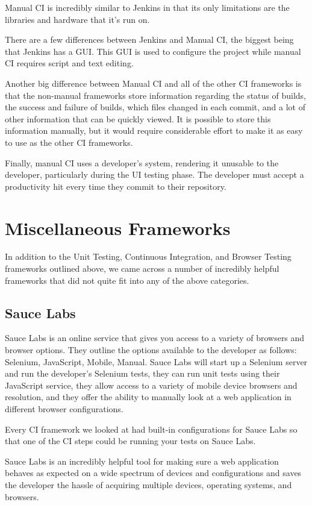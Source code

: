 \documentclass[12pt]{ucthesis}
\begin{document}
Manual CI is incredibly similar to Jenkins in that its only limitations are the libraries and hardware that it's run on.

There are a few differences between Jenkins and Manual CI, the biggest being that Jenkins has a GUI. This GUI is used to configure the project while manual CI requires script and text editing. 

Another big difference between Manual CI and all of the other CI frameworks is that the non-manual frameworks store information regarding the status of builds, the success and failure of builds, which files changed in each commit, and a lot of other information that can be quickly viewed. It is possible to store this information manually, but it would require considerable effort to make it as easy to use as the other CI frameworks.

Finally, manual CI uses a developer's system, rendering it unusable to the developer, particularly during the UI testing phase. The developer must accept a productivity hit every time they commit to their repository.

\section{Miscellaneous Frameworks}
In addition to the Unit Testing, Continuous Integration, and Browser Testing frameworks outlined above, we came across a number of incredibly helpful frameworks that did not quite fit into any of the above categories.

\subsection{Sauce Labs}
Sauce Labs\cite{SauceLabs} is an online service that gives you access to a variety of browsers and browser options. They outline the options available to the developer as follows: Selenium, JavaScript, Mobile, Manual. Sauce Labs will start up a Selenium server and run the developer's Selenium tests, they can run unit tests using their JavaScript service, they allow access to a variety of mobile device browsers and resolution, and they offer the ability to manually look at a web application in different browser configurations.

Every CI framework we looked at had built-in configurations for Sauce Labs so that one of the CI steps could be running your tests on Sauce Labs.

Sauce Labs is an incredibly helpful tool for making sure a web application behaves as expected on a wide spectrum of devices and configurations and saves the developer the hassle of acquiring multiple devices, operating systems, and browsers.
\end{document}
